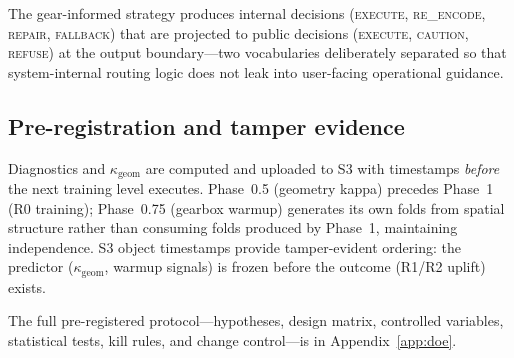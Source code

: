 The gear-informed strategy produces internal decisions
(\textsc{execute}, \textsc{re\_encode}, \textsc{repair},
\textsc{fallback}) that are projected to public decisions
(\textsc{execute}, \textsc{caution}, \textsc{refuse}) at the output
boundary---two vocabularies deliberately separated so that system-internal
routing logic does not leak into user-facing operational guidance.

\subsection{Pre-registration and tamper evidence}
\label{sec:preregistration}

Diagnostics and $\kappa_\text{geom}$ are computed and uploaded to S3
with timestamps \emph{before} the next training level executes.
Phase~0.5 (geometry kappa) precedes Phase~1 (R0 training); Phase~0.75
(gearbox warmup) generates its own folds from spatial structure rather
than consuming folds produced by Phase~1, maintaining independence. S3
object timestamps provide tamper-evident ordering: the predictor
($\kappa_\text{geom}$, warmup signals) is frozen before the outcome
(R1/R2 uplift) exists.

The full pre-registered protocol---hypotheses, design matrix, controlled
variables, statistical tests, kill rules, and change control---is in
Appendix~\ref{app:doe}.
